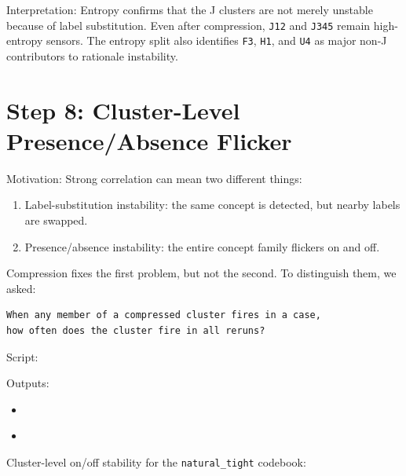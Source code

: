 \documentclass[11pt]{article}
\begin{document}
Interpretation: Entropy confirms that the J clusters are not merely unstable because of label substitution. Even after compression, \texttt{J12} and \texttt{J345} remain high-entropy sensors. The entropy split also identifies \texttt{F3}, \texttt{H1}, and \texttt{U4} as major non-J contributors to rationale instability.

\section*{Step 8: Cluster-Level Presence/Absence Flicker}

Motivation: Strong correlation can mean two different things:

\begin{enumerate}[leftmargin=1.5em]
  \item Label-substitution instability: the same concept is detected, but nearby labels are swapped.
  \item Presence/absence instability: the entire concept family flickers on and off.
\end{enumerate}

Compression fixes the first problem, but not the second. To distinguish them, we asked:

\begin{verbatim}
When any member of a compressed cluster fires in a case,
how often does the cluster fire in all reruns?
\end{verbatim}

Script:

\href{../scripts/measure_cluster_flicker.py}{}

Outputs:

\begin{itemize}[leftmargin=1.5em]
  \item \href{../results/compressed_rulebook/cluster_flicker_summary_reruns.csv}{}
  \item \href{../results/compressed_rulebook/cluster_flicker_cases_reruns.csv}{}
\end{itemize}

Cluster-level on/off stability for the \texttt{natural\_tight} codebook:
\end{document}
